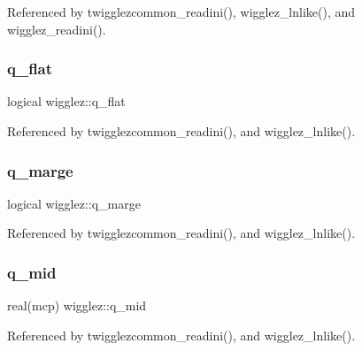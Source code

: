 Referenced by twigglezcommon\+\_\+readini(), wigglez\+\_\+lnlike(), and wigglez\+\_\+readini().

\mbox{\label{namespacewigglez_a60066dbf058902563e14f3196a4bd03b}} 
\subsubsection{\texorpdfstring{q\+\_\+flat}{q\_flat}}
{\footnotesize\ttfamily logical wigglez\+::q\+\_\+flat\hspace{0.3cm}{\ttfamily [private]}}



Referenced by twigglezcommon\+\_\+readini(), and wigglez\+\_\+lnlike().

\mbox{\label{namespacewigglez_aa9c3ad74ce4e69f0fcccd8fdda77186e}} 
\subsubsection{\texorpdfstring{q\+\_\+marge}{q\_marge}}
{\footnotesize\ttfamily logical wigglez\+::q\+\_\+marge\hspace{0.3cm}{\ttfamily [private]}}



Referenced by twigglezcommon\+\_\+readini(), and wigglez\+\_\+lnlike().

\mbox{\label{namespacewigglez_a9d61faf004a432ee806221f52cbabd61}} 
\subsubsection{\texorpdfstring{q\+\_\+mid}{q\_mid}}
{\footnotesize\ttfamily real(mcp) wigglez\+::q\+\_\+mid\hspace{0.3cm}{\ttfamily [private]}}



Referenced by twigglezcommon\+\_\+readini(), and wigglez\+\_\+lnlike().

\mbox{\label{namespacewigglez_adecc221b2b57fa0a89ada696e24823d9}} 
